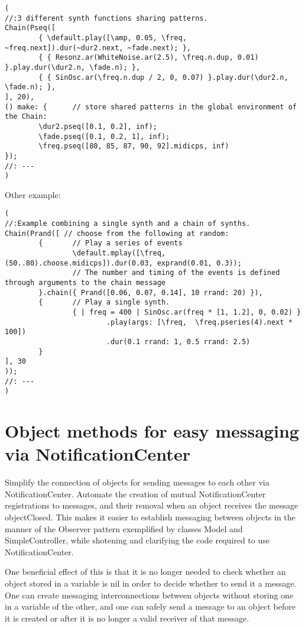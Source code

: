 \documentclass[11pt]{article}
\begin{document}
\begin{verbatim}
(
//:3 different synth functions sharing patterns. 
Chain(Pseq([
        { \default.play([\amp, 0.05, \freq, ~freq.next]).dur(~dur2.next, ~fade.next); },
        { { Resonz.ar(WhiteNoise.ar(2.5), \freq.n.dup, 0.01) }.play.dur(\dur2.n, \fade.n); },
        { { SinOsc.ar(\freq.n.dup / 2, 0, 0.07) }.play.dur(\dur2.n, \fade.n); },
], 20), 
() make: {      // store shared patterns in the global environment of the Chain:
        \dur2.pseq([0.1, 0.2], inf);
        \fade.pseq([0.1, 0.2, 1], inf); 
        \freq.pseq([80, 85, 87, 90, 92].midicps, inf) 
});
//: ---
)
\end{verbatim}

Other example: 

\begin{verbatim}
(
//:Example combining a single synth and a chain of synths.
Chain(Prand([ // choose from the following at random:
        {       // Play a series of events
                \default.mplay([\freq, (50..80).choose.midicps]).dur(0.03, exprand(0.01, 0.3));
                // The number and timing of the events is defined through arguments to the chain message
        }.chain({ Prand([0.06, 0.07, 0.14], 10 rrand: 20) }),
        {       // Play a single synth.
                { | freq = 400 | SinOsc.ar(freq * [1, 1.2], 0, 0.02) }
                        .play(args: [\freq,  \freq.pseries(4).next * 100])
                        .dur(0.1 rrand: 1, 0.5 rrand: 2.5) 
        }
], 30
));
//: ---
)
\end{verbatim}
\section{Object methods for easy messaging via NotificationCenter}
\label{sec-4}


Simplify the connection of objects for sending messages to each other via NotificationCenter. Automate the creation of mutual NotificationCenter registrations to messages, and their removal when an object receives the message objectClosed. This makes it easier to establish messaging between objects in the manner of the Observer pattern exemplified by classes Model and SimpleController, while shotening and clarifying the code required to use NotificationCenter.

One beneficial effect of this is that it is no longer needed to check whether an object stored in a variable is nil in order to decide whether to send it a message. One can create messaging interconnections between objects without storing one in a variable of the other, and one can safely send a message to an object before it is created or after it is no longer a valid receiver of that message. 
\end{document}
